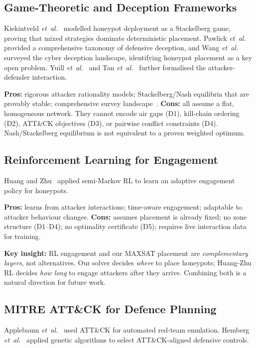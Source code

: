 \documentclass[journal]{IEEEtran}
\newcommand{\etal}{\emph{et~al.}}
\begin{document}
\subsection{Game-Theoretic and Deception Frameworks}

Kiekintveld \etal{}~\cite{kiekintveld2015} modelled honeypot
deployment as a Stackelberg game, proving that mixed
strategies dominate deterministic placement.
Pawlick \etal{}~\cite{pawlick2019} provided a comprehensive
taxonomy of defensive deception, and Wang \etal{}~\cite{wang2018}
surveyed the cyber deception landscape, identifying honeypot
placement as a key open problem.
Yuill \etal{}~\cite{yuill2004} and Tan \etal{}~\cite{tan2011}
further formalised the attacker-defender interaction.

\textbf{Pros:} rigorous attacker rationality models;
Stackelberg/Nash equilibria that are provably stable;
comprehensive survey landscape~\cite{wang2018}.
\textbf{Cons:} all assume a flat, homogeneous network.
They cannot encode air gaps (D1), kill-chain ordering (D2),
ATT\&CK objectives (D3), or pairwise conflict constraints
(D4). Nash/Stackelberg equilibrium is not equivalent to a
proven weighted optimum.

\subsection{Reinforcement Learning for Engagement}

Huang and Zhu~\cite{huang2019} applied semi-Markov RL to
learn an adaptive engagement policy for honeypots.

\textbf{Pros:} learns from attacker interactions; time-aware
engagement; adaptable to attacker behaviour changes.
\textbf{Cons:} assumes placement is already fixed; no zone
structure (D1--D4); no optimality certificate (D5); requires
live interaction data for training.

\textbf{Key insight:} RL engagement and our MAXSAT placement
are \emph{complementary layers}, not alternatives.
Our solver decides \emph{where} to place honeypots;
Huang-Zhu RL decides \emph{how long} to engage attackers
after they arrive.
Combining both is a natural direction for future work.

\subsection{MITRE ATT\&CK for Defence Planning}

Applebaum \etal{}~\cite{applebaum2016} used ATT\&CK for
automated red-team emulation.
Hemberg \etal{}~\cite{hemberg2020} applied genetic
algorithms to select ATT\&CK-aligned defensive controls.
\end{document}
